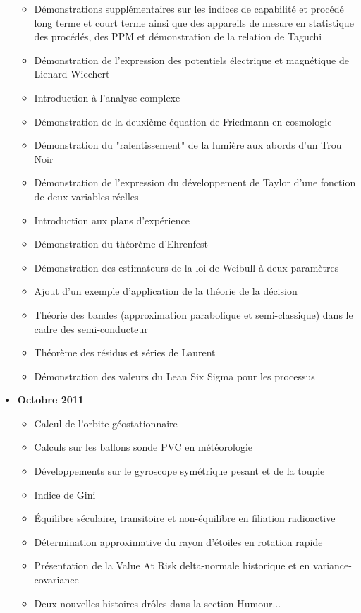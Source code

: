 \begin{itemize}
\begin{itemize}[noitemsep]
				\item Démonstrations supplémentaires sur les indices de capabilité et procédé long terme et court terme ainsi que des appareils de mesure en statistique des procédés, des PPM et démonstration de la relation de Taguchi
				\item Démonstration de l'expression des potentiels électrique et magnétique de Lienard-Wiechert
				\item Introduction à l'analyse complexe
				\item Démonstration de la deuxième équation de Friedmann en cosmologie
				\item Démonstration du "ralentissement" de la lumière aux abords d'un Trou Noir
				\item Démonstration de l'expression du développement de Taylor d'une fonction de deux variables réelles
				\item Introduction aux plans d'expérience
				\item Démonstration du théorème d'Ehrenfest
				\item Démonstration des estimateurs de la loi de Weibull à deux paramètres
				\item Ajout d'un exemple d'application de la théorie de la décision
				\item Théorie des bandes (approximation parabolique et semi-classique) dans le cadre des semi-conducteur
				\item Théorème des résidus et séries de Laurent
				\item Démonstration des valeurs du Lean Six Sigma pour les processus
			\end{itemize}
		\item \textbf{Octobre 2011}
			\begin{itemize}[noitemsep]
				\item Calcul de l'orbite géostationnaire
				\item Calculs sur les ballons sonde PVC en météorologie
				\item Développements sur le gyroscope symétrique pesant et de la toupie
				\item Indice de Gini
				\item Équilibre séculaire, transitoire et non-équilibre en filiation radioactive
				\item Détermination approximative du rayon d'étoiles en rotation rapide
				\item Présentation de la Value At Risk delta-normale historique et en variance-covariance
				\item Deux nouvelles histoires drôles dans la section Humour...

\end{itemize}
\end{itemize}
